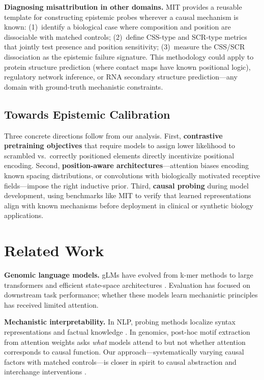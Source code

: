 \documentclass{article}
\begin{document}
\textbf{Diagnosing misattribution in other domains.}
MIT provides a reusable template for constructing epistemic probes
wherever a causal mechanism is known:
(1)~identify a biological case where composition and position are
dissociable with matched controls; (2)~define CSS-type and SCR-type
metrics that jointly test presence and position sensitivity;
(3)~measure the CSS/SCR dissociation as the epistemic failure signature.
This methodology could apply to protein structure prediction (where
contact maps have known positional logic), regulatory network inference,
or RNA secondary structure prediction---any domain with ground-truth
mechanistic constraints.

\subsection{Towards Epistemic Calibration}

Three concrete directions follow from our analysis.
First, \textbf{contrastive pretraining objectives} that require models to
assign lower likelihood to scrambled vs.\ correctly positioned elements
directly incentivize positional encoding.
Second, \textbf{position-aware architectures}---attention biases encoding
known spacing distributions, or convolutions with biologically motivated
receptive fields---impose the right inductive prior.
Third, \textbf{causal probing} during model development, using benchmarks
like MIT to verify that learned representations align with known
mechanisms before deployment in clinical or synthetic biology
applications.

\section{Related Work}

\textbf{Genomic language models.}
gLMs have evolved from k-mer methods \citep{lee2011discriminative} to
large transformers \citep{ji2021dnabert,dalla2023nucleotide,zhou2023dnabert2}
and efficient state-space architectures
\citep{nguyen2023hyenadna,schiff2024caduceus}.
Evaluation has focused on downstream task performance; whether these
models learn mechanistic principles has received limited attention.

\textbf{Mechanistic interpretability.}
In NLP, probing methods localize syntax representations
\citep{hewitt2019structural} and factual knowledge
\citep{meng2022locating}.
In genomics, post-hoc motif extraction from attention weights
\citep{novakovsky2023obtaining} asks \emph{what} models attend to but
not whether attention corresponds to causal function.
Our approach---systematically varying causal factors with matched
controls---is closer in spirit to causal abstraction
\citep{geiger2021causal} and interchange interventions
\citep{meng2022locating}.
\end{document}
